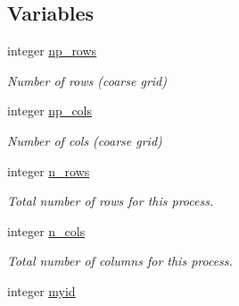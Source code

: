\subsection*{Variables}
\begin{DoxyCompactItemize}
\item 
\hypertarget{namespacempi__tools_a7f94925d36c98e8a06136fbcb7e6f44c}{}integer \hyperlink{namespacempi__tools_a7f94925d36c98e8a06136fbcb7e6f44c}{np\+\_\+rows}\label{namespacempi__tools_a7f94925d36c98e8a06136fbcb7e6f44c}

\begin{DoxyCompactList}\small\item\em Number of rows (coarse grid) \end{DoxyCompactList}\item 
\hypertarget{namespacempi__tools_af82cb2ef72d82264396316dd69b2f670}{}integer \hyperlink{namespacempi__tools_af82cb2ef72d82264396316dd69b2f670}{np\+\_\+cols}\label{namespacempi__tools_af82cb2ef72d82264396316dd69b2f670}

\begin{DoxyCompactList}\small\item\em Number of cols (coarse grid) \end{DoxyCompactList}\item 
\hypertarget{namespacempi__tools_a91df58024c9c899973514f877a946d37}{}integer \hyperlink{namespacempi__tools_a91df58024c9c899973514f877a946d37}{n\+\_\+rows}\label{namespacempi__tools_a91df58024c9c899973514f877a946d37}

\begin{DoxyCompactList}\small\item\em Total number of rows for this process. \end{DoxyCompactList}\item 
\hypertarget{namespacempi__tools_a30559d4e61ea9bccb177593934a65492}{}integer \hyperlink{namespacempi__tools_a30559d4e61ea9bccb177593934a65492}{n\+\_\+cols}\label{namespacempi__tools_a30559d4e61ea9bccb177593934a65492}

\begin{DoxyCompactList}\small\item\em Total number of columns for this process. \end{DoxyCompactList}\item 
\hypertarget{namespacempi__tools_ad3cb5feb291992c32fc58d49f150d5bf}{}integer \hyperlink{namespacempi__tools_ad3cb5feb291992c32fc58d49f150d5bf}{myid}\label{namespacempi__tools_ad3cb5feb291992c32fc58d49f150d5bf}


\end{DoxyCompactItemize}
